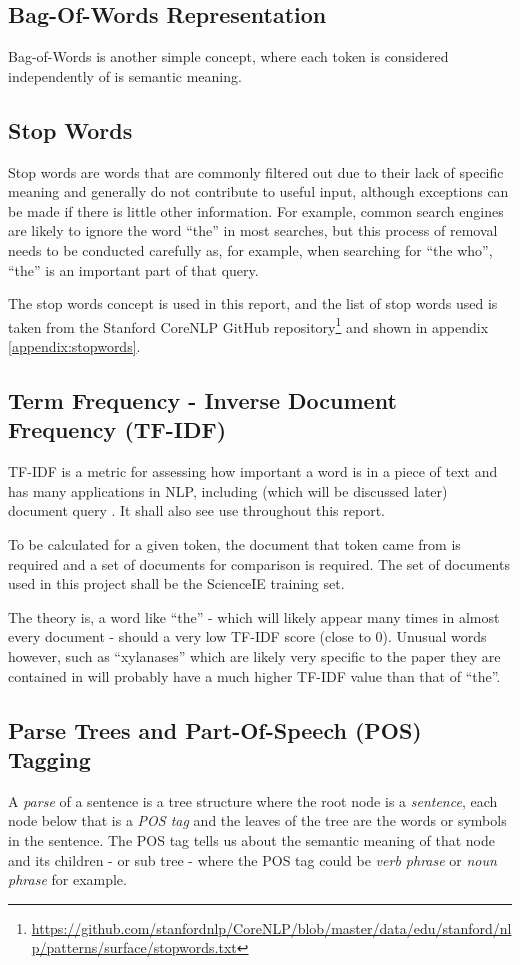 \subsection*{Bag-Of-Words Representation}
Bag-of-Words is another simple concept, where each token is considered independently of is semantic meaning. 

\subsection*{Stop Words}
Stop words are words that are commonly filtered out due to their lack of specific meaning and generally do not contribute to useful input, although exceptions can be made if there is little other information. For example, common search engines are likely to ignore the word ``the'' in most searches, but this process of removal needs to be conducted carefully as, for example, when searching for ``the who'', ``the'' is an important part of that query. 

The stop words concept is used in this report, and the list of stop words used is taken from the Stanford CoreNLP GitHub repository\footnote{\href{https://github.com/stanfordnlp/CoreNLP/blob/master/data/edu/stanford/nlp/patterns/surface/stopwords.txt}{https://github.com/stanfordnlp/CoreNLP/blob/master/data/edu/stanford/nlp/patterns/surface/stopwords.txt}} and shown in appendix \ref{appendix:stopwords}.

\subsection*{Term Frequency - Inverse Document Frequency (TF-IDF)}
TF-IDF is a metric for assessing how important a word is in a piece of text and has many applications in NLP, including (which will be discussed later) document query \cite{Ramos2003}. It shall also see use throughout this report.

To be calculated for a given token, the document that token came from is required and a set of documents for comparison is required. The set of documents used in this project shall be the ScienceIE training set.

The theory is, a word like ``the'' - which will likely appear many times in almost every document - should a very low TF-IDF score (close to 0). Unusual words however, such as ``xylanases'' which are likely very specific to the paper they are contained in will probably have a much higher TF-IDF value than that of ``the''.

\subsection*{Parse Trees and Part-Of-Speech (POS) Tagging}
A \textit{parse} of a sentence is a tree structure where the root node is a \textit{sentence}, each node below that is a \textit{POS tag} and the leaves of the tree are the words or symbols in the sentence. The POS tag tells us about the semantic meaning of that node and its children - or sub tree - where the POS tag could be \textit{verb phrase} or \textit{noun phrase} for example.

